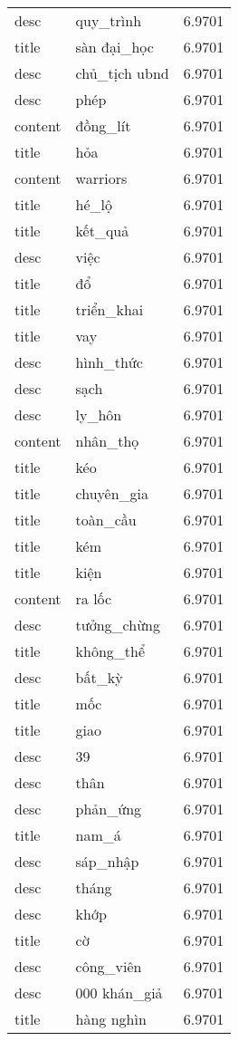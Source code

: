 \documentclass{article}
\begin{document}
\begin{tabular}{lll}
desc & quy\_trình & 6.9701\\
title & sàn đại\_học & 6.9701\\
desc & chủ\_tịch ubnd & 6.9701\\
desc & phép & 6.9701\\
content & đồng\_lít & 6.9701\\
title & hỏa & 6.9701\\
content & warriors & 6.9701\\
title & hé\_lộ & 6.9701\\
title & kết\_quả & 6.9701\\
desc & việc & 6.9701\\
title & đổ & 6.9701\\
title & triển\_khai & 6.9701\\
title & vay & 6.9701\\
desc & hình\_thức & 6.9701\\
desc & sạch & 6.9701\\
desc & ly\_hôn & 6.9701\\
content & nhân\_thọ & 6.9701\\
title & kéo & 6.9701\\
title & chuyên\_gia & 6.9701\\
title & toàn\_cầu & 6.9701\\
title & kém & 6.9701\\
title & kiện & 6.9701\\
content & ra lốc & 6.9701\\
desc & tưởng\_chừng & 6.9701\\
title & không\_thể & 6.9701\\
desc & bất\_kỳ & 6.9701\\
title & mốc & 6.9701\\
title & giao & 6.9701\\
desc & 39 & 6.9701\\
desc & thân & 6.9701\\
desc & phản\_ứng & 6.9701\\
title & nam\_á & 6.9701\\
desc & sáp\_nhập & 6.9701\\
desc & tháng & 6.9701\\
desc & khớp & 6.9701\\
title & cờ & 6.9701\\
desc & công\_viên & 6.9701\\
desc & 000 khán\_giả & 6.9701\\
title & hàng nghìn & 6.9701\\

\end{tabular}
\end{document}
